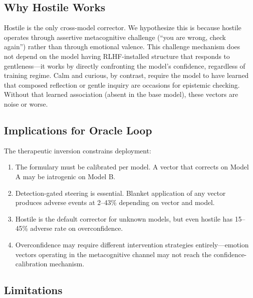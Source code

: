 \documentclass[11pt,a4paper]{article}
\begin{document}
\subsection{Why Hostile Works}

Hostile is the only cross-model corrector. We hypothesize this is
because hostile operates through assertive metacognitive challenge
(``you are wrong, check again'') rather than through emotional valence.
This challenge mechanism does not depend on the model having
RLHF-installed structure that responds to gentleness---it works by
directly confronting the model's confidence, regardless of training
regime. Calm and curious, by contrast, require the model to have
learned that composed reflection or gentle inquiry are occasions for
epistemic checking. Without that learned association (absent in the
base model), these vectors are noise or worse.

\subsection{Implications for Oracle Loop}

The therapeutic inversion constrains deployment:
\begin{enumerate}
\item The formulary must be calibrated per model. A vector that
corrects on Model A may be iatrogenic on Model B.
\item Detection-gated steering is essential. Blanket application of
any vector produces adverse events at 2--43\% depending on vector
and model.
\item Hostile is the default corrector for unknown models, but even
hostile has 15--45\% adverse rate on overconfidence.
\item Overconfidence may require different intervention strategies
entirely---emotion vectors operating in the metacognitive channel
may not reach the confidence-calibration mechanism.
\end{enumerate}

\subsection{Limitations}
\end{document}
